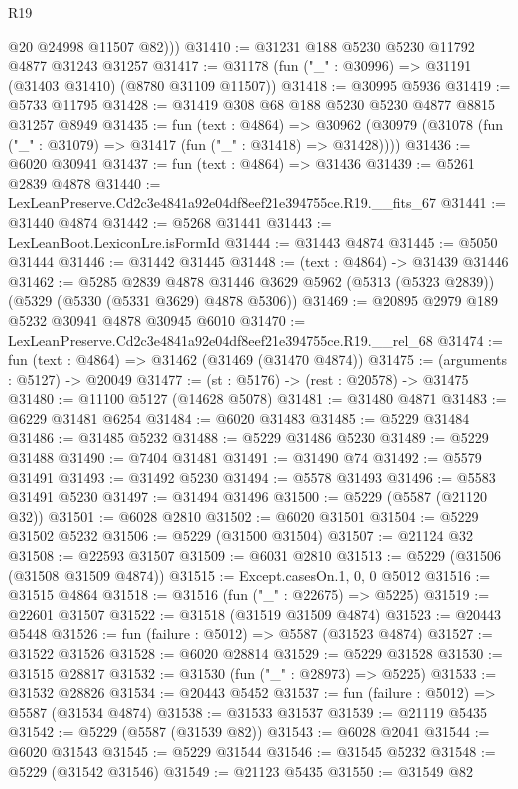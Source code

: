 \begin{lexlean}{R19}
\begin{coremodule}
          @20
          @24998
          @11507
          @82)))
@31410 := @31231 @188 @5230 @5230 @11792 @4877 @31243 @31257
@31417 := @31178 (fun ("_" : @30996) => @31191 (@31403 @31410) (@8780 @31109 @11507))
@31418 := @30995 @5936
@31419 := @5733 @11795
@31428 := @31419 @308 @68 @188 @5230 @5230 @4877 @8815 @31257 @8949
@31435 := fun (text : @4864) =>
  @30962 (@30979 (@31078 (fun ("_" : @31079) => @31417 (fun ("_" : @31418) => @31428))))
@31436 := @6020 @30941
@31437 := fun (text : @4864) => @31436
@31439 := @5261 @2839 @4878
@31440 := LexLeanPreserve.Cd2c3e4841a92e04df8eef21e394755ce.R19.__fits_67
@31441 := @31440 @4874
@31442 := @5268 @31441
@31443 := LexLeanBoot.LexiconLre.isFormId
@31444 := @31443 @4874
@31445 := @5050 @31444
@31446 := @31442 @31445
@31448 := (text : @4864) -> @31439 @31446
@31462 := @5285
    @2839
    @4878
    @31446
    @3629
    @5962
    (@5313 (@5323 @2839))
    (@5329 (@5330 (@5331 @3629) @4878 @5306))
@31469 := @20895 @2979 @189 @5232 @30941 @4878 @30945 @6010
@31470 := LexLeanPreserve.Cd2c3e4841a92e04df8eef21e394755ce.R19.__rel_68
@31474 := fun (text : @4864) => @31462 (@31469 (@31470 @4874))
@31475 := (arguments : @5127) -> @20049
@31477 := (st : @5176) -> (rest : @20578) -> @31475
@31480 := @11100 @5127 (@14628 @5078)
@31481 := @31480 @4871
@31483 := @6229 @31481 @6254
@31484 := @6020 @31483
@31485 := @5229 @31484
@31486 := @31485 @5232
@31488 := @5229 @31486 @5230
@31489 := @5229 @31488
@31490 := @7404 @31481
@31491 := @31490 @74
@31492 := @5579 @31491
@31493 := @31492 @5230
@31494 := @5578 @31493
@31496 := @5583 @31491 @5230
@31497 := @31494 @31496
@31500 := @5229 (@5587 (@21120 @32))
@31501 := @6028 @2810
@31502 := @6020 @31501
@31504 := @5229 @31502 @5232
@31506 := @5229 (@31500 @31504)
@31507 := @21124 @32
@31508 := @22593 @31507
@31509 := @6031 @2810
@31513 := @5229 (@31506 (@31508 @31509 @4874))
@31515 := Except.casesOn.{1, 0, 0} @5012
@31516 := @31515 @4864
@31518 := @31516 (fun ("_" : @22675) => @5225)
@31519 := @22601 @31507
@31522 := @31518 (@31519 @31509 @4874)
@31523 := @20443 @5448
@31526 := fun (failure : @5012) => @5587 (@31523 @4874)
@31527 := @31522 @31526
@31528 := @6020 @28814
@31529 := @5229 @31528
@31530 := @31515 @28817
@31532 := @31530 (fun ("_" : @28973) => @5225)
@31533 := @31532 @28826
@31534 := @20443 @5452
@31537 := fun (failure : @5012) => @5587 (@31534 @4874)
@31538 := @31533 @31537
@31539 := @21119 @5435
@31542 := @5229 (@5587 (@31539 @82))
@31543 := @6028 @2041
@31544 := @6020 @31543
@31545 := @5229 @31544
@31546 := @31545 @5232
@31548 := @5229 (@31542 @31546)
@31549 := @21123 @5435
@31550 := @31549 @82

\end{coremodule}
\end{lexlean}
